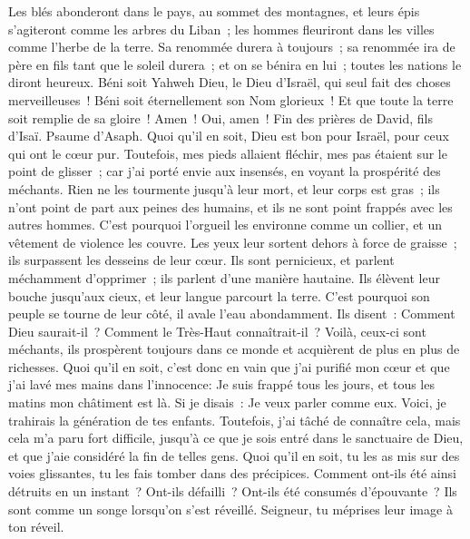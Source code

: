 \begin{multicols}{2}
Les blés abonderont dans le pays, au sommet des montagnes, et leurs épis s'agiteront comme les arbres du Liban~; les hommes fleuriront dans les villes comme l'herbe de la terre.
Sa renommée durera à toujours~; sa renommée ira de père en fils tant que le soleil durera~; et on se bénira en lui~; toutes les nations le diront heureux.
Béni soit Yahweh Dieu, le Dieu d'Israël, qui seul fait des choses merveilleuses~!
Béni soit éternellement son Nom glorieux~! Et que toute la terre soit remplie de sa gloire~! Amen~! Oui, amen~!
Fin des prières de David, fils d'Isaï.
\VerseOne{}Psaume d'Asaph. Quoi qu'il en soit, Dieu est bon pour Israël, pour ceux qui ont le cœur pur.
Toutefois, mes pieds allaient fléchir, mes pas étaient sur le point de glisser~;
car j'ai porté envie aux insensés, en voyant la prospérité des méchants.
Rien ne les tourmente jusqu'à leur mort, et leur corps est gras~;
ils n'ont point de part aux peines des humains, et ils ne sont point frappés avec les autres hommes.
C'est pourquoi l'orgueil les environne comme un collier, et un vêtement de violence les couvre.
Les yeux leur sortent dehors à force de graisse~; ils surpassent les desseins de leur cœur.
Ils sont pernicieux, et parlent méchamment d'opprimer~; ils parlent d'une manière hautaine.
Ils élèvent leur bouche jusqu'aux cieux, et leur langue parcourt la terre.
C'est pourquoi son peuple se tourne de leur côté, il avale l'eau abondamment.
Ils disent~: Comment Dieu saurait-il~? Comment le Très-Haut connaîtrait-il~?
Voilà, ceux-ci sont méchants, ils prospèrent toujours dans ce monde et acquièrent de plus en plus de richesses.
Quoi qu'il en soit, c'est donc en vain que j'ai purifié mon cœur et que j'ai lavé mes mains dans l'innocence:
Je suis frappé tous les jours, et tous les matins mon châtiment est là.
Si je disais~: Je veux parler comme eux. Voici, je trahirais la génération de tes enfants.
Toutefois, j'ai tâché de connaître cela, mais cela m'a paru fort difficile,
jusqu'à ce que je sois entré dans le sanctuaire de Dieu, et que j'aie considéré la fin de telles gens.
Quoi qu'il en soit, tu les as mis sur des voies glissantes, tu les fais tomber dans des précipices.
Comment ont-ils été ainsi détruits en un instant~? Ont-ils défailli~? Ont-ils été consumés d'épouvante~?
Ils sont comme un songe lorsqu'on s'est réveillé. Seigneur, tu méprises leur image à ton réveil.

\end{multicols}
